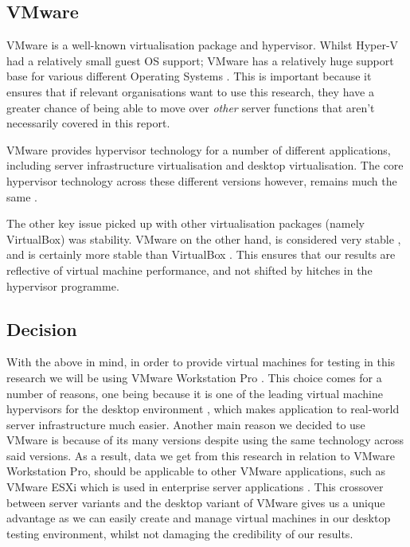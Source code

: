 \subsection{VMware}
VMware is a well-known virtualisation package and hypervisor. Whilst Hyper-V had a relatively small guest OS support; VMware has a relatively huge support base for various different Operating Systems \citep{HyperVVMwareComparison} \citep{VMwareCompatabilityGuide}. This is important because it ensures that if relevant organisations want to use this research, they have a greater chance of being able to move over \emph{other} server functions that aren't necessarily covered in this report.

VMware provides hypervisor technology for a number of different applications, including server infrastructure virtualisation and desktop virtualisation. The core hypervisor technology across these different versions however, remains much the same \citep{VMwareProductGuide}.

The other key issue picked up with other virtualisation packages (namely VirtualBox) was stability. VMware on the other hand, is considered very stable \citep{pavlik2012supervisory}, and is certainly more stable than VirtualBox \citep{bradford_2020}. This ensures that our results are reflective of virtual machine performance, and not shifted by hitches in the hypervisor programme.

\subsection{Decision}
With the above in mind, in order to provide virtual machines for testing in this research we will be using VMware Workstation Pro \citep{VMwareWorkstationPro}. This choice comes for a number of reasons, one being because it is one of the leading virtual machine hypervisors for the desktop environment \citep{BestVirtualisationSoftware}, which makes application to real-world server infrastructure much easier. Another main reason we decided to use VMware is because of its many versions despite using the same technology across said versions. As a result, data we get from this research in relation to VMware Workstation Pro, should be applicable to other VMware applications, such as VMware ESXi which is used in enterprise server applications \citep{esxivmware}. This crossover between server variants and the desktop variant of VMware gives us a unique advantage as we can easily create and manage virtual machines in our desktop testing environment, whilst not damaging the credibility of our results.

